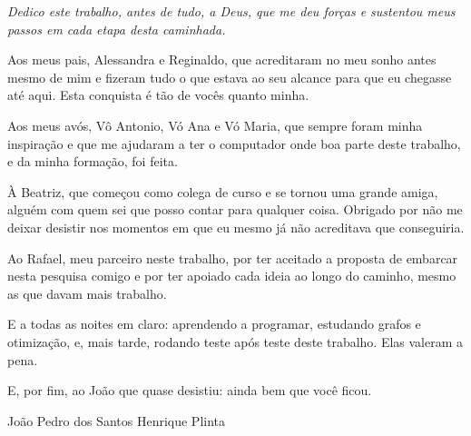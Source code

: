 \documentclass{ifpr-pinhais}
\begin{document}
\frenchspacing

\pretextual

\imprimircapa

\imprimirfolhaderosto

\imprimirfolhadeaprovacao

\begin{dedicatoria}
  \vspace*{\fill}
  \hfill
  \begin{minipage}{.6\textwidth}
    \itshape
    \setlength{\parskip}{.6\baselineskip}
    Dedico este trabalho, antes de tudo, a Deus, que me deu forças e sustentou
    meus passos em cada etapa desta caminhada.

    Aos meus pais, Alessandra e Reginaldo, que acreditaram no meu sonho antes
    mesmo de mim e fizeram tudo o que estava ao seu alcance para que eu
    chegasse até aqui. Esta conquista é tão de vocês quanto minha.

    Aos meus avós, Vô Antonio, Vó Ana e Vó Maria, que
    sempre foram minha inspiração e que me ajudaram a ter o
    computador onde boa parte deste trabalho, e da minha formação, foi feita.

    À Beatriz, que começou como colega de curso e se tornou uma grande amiga,
    alguém com quem sei que posso contar para qualquer coisa. Obrigado por não
    me deixar desistir nos momentos em que eu mesmo já não acreditava que
    conseguiria.

    Ao Rafael, meu parceiro neste trabalho, por ter aceitado a proposta de
    embarcar nesta pesquisa comigo e por ter apoiado cada ideia ao longo do
    caminho, mesmo as que davam mais trabalho.

    E a todas as noites em claro: aprendendo a programar, estudando grafos e otimização, e, mais
    tarde, rodando teste após teste deste trabalho. Elas valeram a pena.

    E, por fim, ao João que quase desistiu: ainda bem que você ficou.

    \begin{flushright}
      \upshape João Pedro dos Santos Henrique Plinta
    \end{flushright}

    \vspace{2\onelineskip}


\end{minipage}
\end{dedicatoria}
\end{document}
